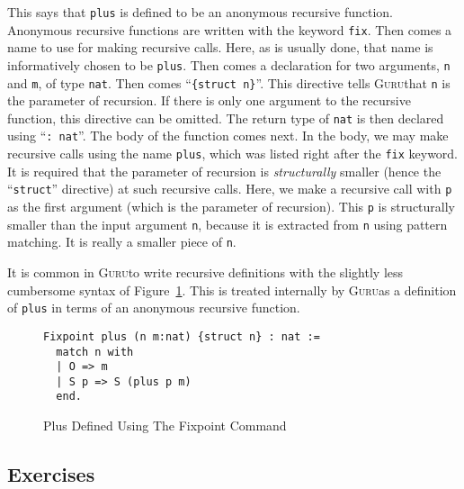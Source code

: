 \documentclass{book}[12pt]
\newcommand{\guru}[0]{\textsc{Guru}}
\begin{document}
\noindent This says that \texttt{plus} is defined to be an anonymous
recursive function.  Anonymous recursive functions are written with
the keyword \texttt{fix}.  Then comes a name to use for making
recursive calls.  Here, as is usually done, that name is informatively
chosen to be \texttt{plus}.  Then comes a declaration for two
arguments, \texttt{n} and \texttt{m}, of type \texttt{nat}.  Then
comes ``\texttt{\{struct n\}}''.  This directive tells \guru that
\texttt{n} is the parameter of recursion.  If there is only one
argument to the recursive function, this directive can be omitted.
The return type of \texttt{nat} is then declared using ``\texttt{:
nat}''.  The body of the function comes next.  In the body, we may
make recursive calls using the name \texttt{plus}, which was listed
right after the \texttt{fix} keyword.  It is required that the
parameter of recursion is \emph{structurally} smaller (hence the
``\texttt{struct}'' directive) at such recursive calls.  Here, we make
a recursive call with \texttt{p} as the first argument (which is the
parameter of recursion).  This \texttt{p} is structurally smaller than
the input argument \texttt{n}, because it is extracted from \texttt{n}
using pattern matching.  It is really a smaller piece of \texttt{n}.

It is common in \guru to write recursive definitions with the slightly
less cumbersome syntax of Figure~\ref{fig:fixplus}.  This is treated
internally by \guru as a definition of \texttt{plus} in terms of an
anonymous recursive function.

\begin{figure}
\begin{verbatim}
Fixpoint plus (n m:nat) {struct n} : nat :=
  match n with
  | O => m
  | S p => S (plus p m)
  end.
\end{verbatim}
\caption{\label{fig:fixplus}Plus Defined Using The Fixpoint Command}
\end{figure}


\subsection{Exercises}
\end{document}
